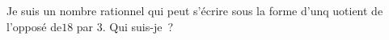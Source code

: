%
%
Je suis un nombre rationnel qui peut s'écrire sous la forme d'unq uotient de l'opposé de$18$ par $3$. Qui suis-je~?

